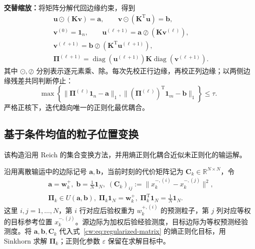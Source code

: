 \textbf{交替缩放：}将矩阵分解代回边缘约束，得到
\begin{equation}\label{cw:eq:sinkhorn-iteration}
\begin{aligned}
&\bm u\odot(\bm K\bm v)=\bm a,\qquad
\bm v\odot(\bm K^{\mathrm T}\bm u)=\bm b,\\
&\bm v^{(0)}=\mathbf1_n,\qquad
\bm u^{(\ell+1)}=\bm a\oslash(\bm K\bm v^{(\ell)}),\\
&\bm v^{(\ell+1)}=\bm b\oslash(\bm K^{\mathrm T}\bm u^{(\ell+1)}),\\
&\bm\Pi^{(\ell+1)}
=\operatorname{diag}(\bm u^{(\ell+1)})\bm K\operatorname{diag}(\bm v^{(\ell+1)}).
\end{aligned}
\end{equation}
其中 $\odot,\oslash$ 分别表示逐元素乘、除。每次先校正行边缘，再校正列边缘；以两侧边缘残差共同判断停止：
\begin{equation}\label{cw:eq:sinkhorn-stop}
\max\!\left\{\|\bm\Pi^{(\ell)}\mathbf1_n-\bm a\|_1,
\|(\bm\Pi^{(\ell)})^{\mathrm T}\mathbf1_m-\bm b\|_1\right\}\le\tau.
\end{equation}
严格正核下，迭代趋向唯一的正则化最优耦合。

\subsection{基于条件均值的粒子位置变换}\label{cw:sec:ot-resampling}

该构造沿用 Reich 的集合变换方法\cite{reich2013nonparametric}，并用熵正则化耦合近似未正则化的输运解。

沿用离散输运中的边际记号 $\bm a,\bm b$，当前时刻的代价矩阵记为 $\bm C_k\in\mathbb R^{N\times N}$，令
\begin{equation}\label{cw:eq:particle-ot-input}
\begin{aligned}
&\bm a=\bm w_k^+,\;\bm b=\frac1N\mathbf1_N,\;(\bm C_k)_{ij}:=\|x_k^{-,(i)}-x_k^{-,(j)}\|^2,\\
&\bm\Pi_k\in U(\bm a,\bm b),\;\bm\Pi_k\mathbf1_N=\bm w_k^+,\;\bm\Pi_k^{\mathrm T}\mathbf1_N=\frac1N\mathbf1_N.
\end{aligned}
\end{equation}
这里 $i,j=1,\dots,N$，第 $i$ 行对应后验权重为 $w_k^{+,(i)}$ 的预测粒子，第 $j$ 列对应等权的目标参考位置 $x_k^{-,(j)}$。源边际为加权后验经验测度，目标边际为等权预测经验测度。将 $\bm a,\bm b,\bm C_k$ 代入式~\eqref{cw:eq:regularized-matrix} 的熵正则化目标，用 Sinkhorn 求解 $\bm\Pi_k$；正则化参数 $\varepsilon$ 保留在求解目标中。

